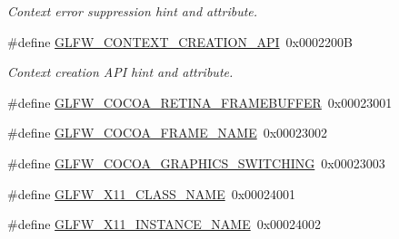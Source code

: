 \begin{DoxyCompactItemize}
\begin{DoxyCompactList}\small\item\em Context error suppression hint and attribute. \end{DoxyCompactList}\item 
\#define \mbox{\hyperlink{group__window_ga5154cebfcd831c1cc63a4d5ac9bb4486}{G\+L\+F\+W\+\_\+\+C\+O\+N\+T\+E\+X\+T\+\_\+\+C\+R\+E\+A\+T\+I\+O\+N\+\_\+\+A\+PI}}~0x0002200B
\begin{DoxyCompactList}\small\item\em Context creation A\+PI hint and attribute. \end{DoxyCompactList}\item 
\#define \mbox{\hyperlink{group__window_gab6ef2d02eb55800d249ccf1af253c35e}{G\+L\+F\+W\+\_\+\+C\+O\+C\+O\+A\+\_\+\+R\+E\+T\+I\+N\+A\+\_\+\+F\+R\+A\+M\+E\+B\+U\+F\+F\+ER}}~0x00023001
\item 
\#define \mbox{\hyperlink{group__window_ga70fa0fbc745de6aa824df79a580e84b5}{G\+L\+F\+W\+\_\+\+C\+O\+C\+O\+A\+\_\+\+F\+R\+A\+M\+E\+\_\+\+N\+A\+ME}}~0x00023002
\item 
\#define \mbox{\hyperlink{group__window_ga53c84ed2ddd94e15bbd44b1f6f7feafc}{G\+L\+F\+W\+\_\+\+C\+O\+C\+O\+A\+\_\+\+G\+R\+A\+P\+H\+I\+C\+S\+\_\+\+S\+W\+I\+T\+C\+H\+I\+NG}}~0x00023003
\item 
\#define \mbox{\hyperlink{group__window_gae5a9ea2fccccd92edbd343fc56461114}{G\+L\+F\+W\+\_\+\+X11\+\_\+\+C\+L\+A\+S\+S\+\_\+\+N\+A\+ME}}~0x00024001
\item 
\#define \mbox{\hyperlink{group__window_ga494c3c0d911e4b860b946530a3e389e8}{G\+L\+F\+W\+\_\+\+X11\+\_\+\+I\+N\+S\+T\+A\+N\+C\+E\+\_\+\+N\+A\+ME}}~0x00024002
\end{DoxyCompactItemize}
